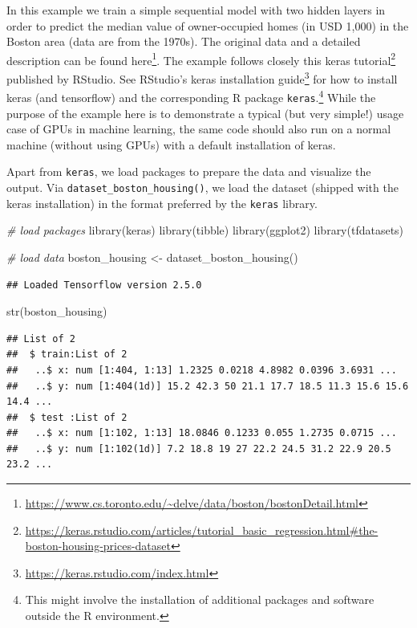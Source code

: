 \documentclass[
  12pt,
]{style/krantz}
\newenvironment{Shaded}{\begin{snugshade}}{\end{snugshade}}
\newcommand{\CommentTok}[1]{\textcolor[rgb]{0.56,0.35,0.01}{\textit{#1}}}
\newcommand{\FunctionTok}[1]{\textcolor[rgb]{0.00,0.00,0.00}{#1}}
\newcommand{\NormalTok}[1]{#1}
\newcommand{\OtherTok}[1]{\textcolor[rgb]{0.56,0.35,0.01}{#1}}
\renewcommand{\href}[2]{#2\footnote{\url{#1}}}
\begin{document}
In this example we train a simple sequential model with two hidden layers in order to predict the median value of owner-occupied homes (in USD 1,000) in the Boston area (data are from the 1970s). The original data and a detailed description can be found \href{https://www.cs.toronto.edu/~delve/data/boston/bostonDetail.html}{here}. The example follows closely \href{https://keras.rstudio.com/articles/tutorial_basic_regression.html\#the-boston-housing-prices-dataset}{this keras tutorial} published by RStudio. See \href{https://keras.rstudio.com/index.html}{RStudio's keras installation guide} for how to install keras (and tensorflow) and the corresponding R package \texttt{keras}.\footnote{This might involve the installation of additional packages and software outside the R environment.} While the purpose of the example here is to demonstrate a typical (but very simple!) usage case of GPUs in machine learning, the same code should also run on a normal machine (without using GPUs) with a default installation of keras.

Apart from \texttt{keras}, we load packages to prepare the data and visualize the output. Via \texttt{dataset\_boston\_housing()}, we load the dataset (shipped with the keras installation) in the format preferred by the \texttt{keras} library.

\begin{Shaded}
\begin{Highlighting}[]
\CommentTok{\# load packages}
\FunctionTok{library}\NormalTok{(keras)}
\FunctionTok{library}\NormalTok{(tibble)}
\FunctionTok{library}\NormalTok{(ggplot2)}
\FunctionTok{library}\NormalTok{(tfdatasets)}


\CommentTok{\# load data}
\NormalTok{boston\_housing }\OtherTok{\textless{}{-}} \FunctionTok{dataset\_boston\_housing}\NormalTok{()}
\end{Highlighting}
\end{Shaded}

\begin{verbatim}
## Loaded Tensorflow version 2.5.0
\end{verbatim}

\begin{Shaded}
\begin{Highlighting}[]
\FunctionTok{str}\NormalTok{(boston\_housing)}
\end{Highlighting}
\end{Shaded}

\begin{verbatim}
## List of 2
##  $ train:List of 2
##   ..$ x: num [1:404, 1:13] 1.2325 0.0218 4.8982 0.0396 3.6931 ...
##   ..$ y: num [1:404(1d)] 15.2 42.3 50 21.1 17.7 18.5 11.3 15.6 15.6 14.4 ...
##  $ test :List of 2
##   ..$ x: num [1:102, 1:13] 18.0846 0.1233 0.055 1.2735 0.0715 ...
##   ..$ y: num [1:102(1d)] 7.2 18.8 19 27 22.2 24.5 31.2 22.9 20.5 23.2 ...
\end{verbatim}
\end{document}
